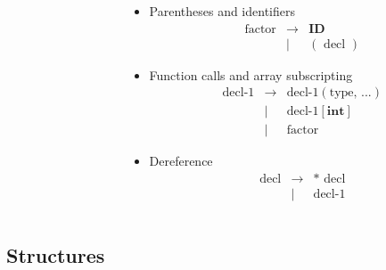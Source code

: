 \documentclass{beamer}
\begin{document}
\begin{frame}
\begin{columns}
{\begin{column}[]{0.5\textwidth}
\begin{example}
                \end{example}
            \end{column}
        }
        \begin{column}[]{0.6\textwidth}
            \begin{itemize}
                \small
                \item Parentheses and identifiers
                      \begin{eqnarray*}
                          \text{factor} & \rightarrow & \textbf{ID} \\
                          & | & ( \text{ decl } )
                      \end{eqnarray*}
                \item Function calls and array subscripting
                      \begin{eqnarray*}
                          \text{decl-1} & \rightarrow & \text{decl-1}(\text{type, ...}) \\
                          & | & \text{decl-1}[\textbf{int}]\\
                          & | &\text{factor}
                      \end{eqnarray*}
                \item Dereference
                      \begin{eqnarray*}
                          \text{decl} & \rightarrow & \textbf{*}\text{ decl} \\
                          & | & \text{decl-1}
                      \end{eqnarray*}
            \end{itemize}
        \end{column}
    \end{columns}

\end{frame}

\subsection{Structures}
\end{document}
